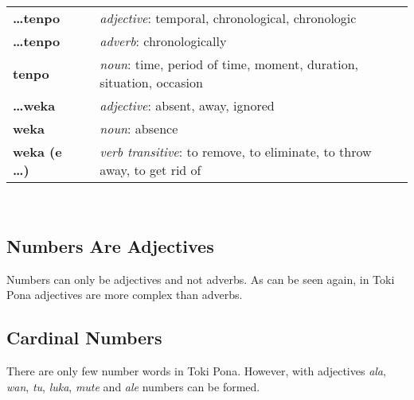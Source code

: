 \begin{supertabular}{p{2,5cm}|ll}
%
\textbf{\dots tenpo} && \textit{adjective}: temporal, chronological, chronologic \\ %
\textbf{\dots tenpo} && \textit{adverb}: chronologically \\ %
\textbf{tenpo} && \textit{noun}: time, period of time, moment, duration, situation, occasion \\ %
%
\textbf{\dots weka} && \textit{adjective}: absent, away, ignored \\ %
\textbf{weka} && \textit{noun}: absence \\ %
\textbf{weka (e \dots)} && \textit{verb transitive}: to remove, to eliminate, to throw away, to get rid of \\ %
%
%
\end{supertabular} \\
%
%
%
\newpage
%
\subsection*{Numbers Are Adjectives}
%
%
Numbers can only be adjectives and not adverbs. 
As can be seen again, in Toki Pona adjectives are more complex than adverbs. 
%

\subsection*{Cardinal Numbers}
%
There are only few number words in Toki Pona.
However, with adjectives \textit{ala}, \textit{wan}, \textit{tu}, \textit{luka}, \textit{mute} and \textit{ale} numbers can be formed.

